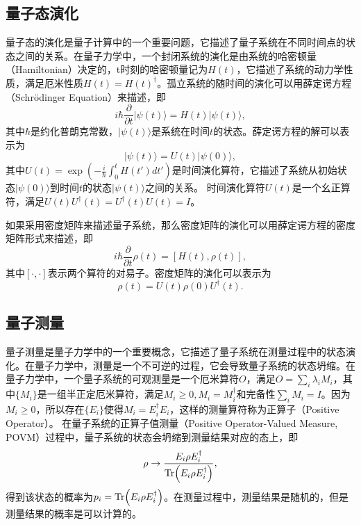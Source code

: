 \subsection{量子态演化}
量子态的演化是量子计算中的一个重要问题，它描述了量子系统在不同时间点的状态之间的关系。在量子力学中，一个封闭系统的演化是由系统的哈密顿量（Hamiltonian）决定的，t时刻的哈密顿量记为$H(t)$，它描述了系统的动力学性质，满足厄米性质$H(t) = H(t)^\dagger$。孤立系统的随时间的演化可以用薛定谔方程（Schrödinger Equation）来描述，即
\begin{equation}
    i\hbar\frac{\partial}{\partial t}|\psi(t)\rangle = H(t)|\psi(t)\rangle,
\end{equation}
其中$\hbar$是约化普朗克常数，$|\psi(t)\rangle$是系统在时间$t$的状态。薛定谔方程的解可以表示为
\begin{equation}
    |\psi(t)\rangle = U(t)|\psi(0)\rangle,
\end{equation}
其中$U(t) = \exp\left(-\frac{i}{\hbar}\int_0^t H(t')dt'\right)$是时间演化算符，它描述了系统从初始状态$|\psi(0)\rangle$到时间$t$的状态$|\psi(t)\rangle$之间的关系。
时间演化算符$U(t)$是一个幺正算符，满足$U(t)U^\dagger(t) = U^\dagger(t)U(t) = I$。


如果采用密度矩阵来描述量子系统，那么密度矩阵的演化可以用薛定谔方程的密度矩阵形式来描述，即
\begin{equation}
    i\hbar\frac{\partial}{\partial t}\rho(t) = [H(t), \rho(t)],
\end{equation}
其中$[\cdot, \cdot]$表示两个算符的对易子。密度矩阵的演化可以表示为
\begin{equation}
    \rho(t) = U(t)\rho(0)U^\dagger(t).
\end{equation}

\subsection{量子测量}
量子测量是量子力学中的一个重要概念，它描述了量子系统在测量过程中的状态演化。在量子力学中，测量是一个不可逆的过程，它会导致量子系统的状态坍缩。在量子力学中，一个量子系统的可观测量是一个厄米算符$O$，满足$O=\sum_i \lambda_i M_i$，其中$\{M_i\}$是一组半正定厄米算符，满足$M_i \geq 0,M_i=M_i^\dagger$和完备性$\sum_i M_i = I$。因为$M_i \geq 0$，所以存在$\{E_i\}$使得$M_i = E_i^\dagger E_i$，这样的测量算符称为正算子（Positive Operator）。
在量子系统的正算子值测量（Positive Operator-Valued Measure, POVM）过程中，量子系统的状态会坍缩到测量结果对应的态上，即
\begin{equation}
    \rho \rightarrow \frac{E_i\rho E_i^\dagger}{\Tr(E_i\rho E_i^\dagger)},
\end{equation}
得到该状态的概率为$p_i = \Tr(E_i\rho E_i^\dagger)$。在测量过程中，测量结果是随机的，但是测量结果的概率是可以计算的。



